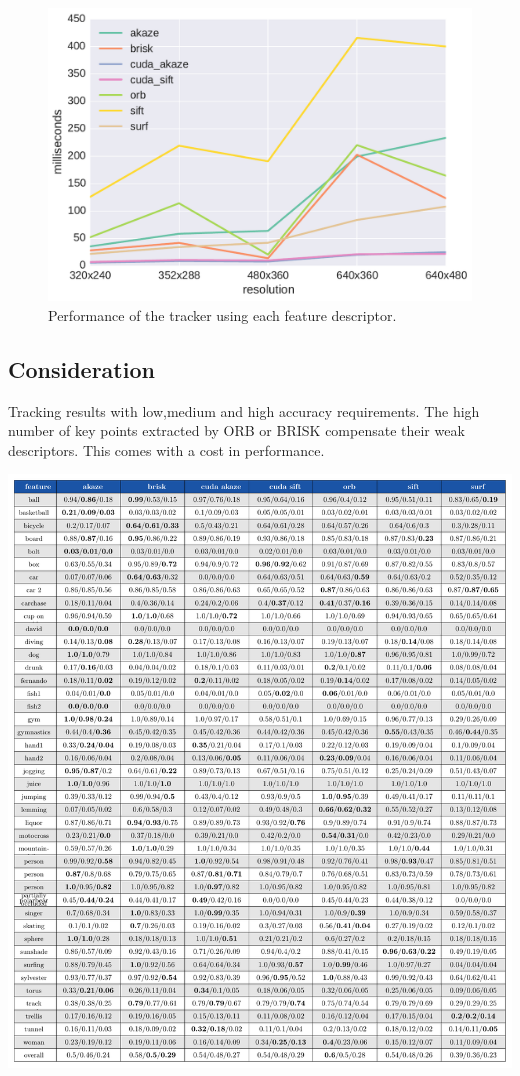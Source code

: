 \begin{figure}
	\includegraphics[width=0.95\linewidth]{imgs/tracker_fps.pdf}
\vspace{-2.5mm}	
\caption{Performance of the tracker using each feature descriptor.}
\label{fig:speed}
\end{figure}

\subsection{Consideration}



\begin{table}[h]
\caption{Tracking results with low,medium and high accuracy requirements. The high number of key points extracted by ORB or BRISK compensate their weak descriptors. This comes with a cost in performance.} 
\centerline{%
		\includegraphics[width=0.98\linewidth]{tables/tracking_precision.pdf}}
    \vspace{-2mm} 
	\label{table:taccuracy}
\end{table}